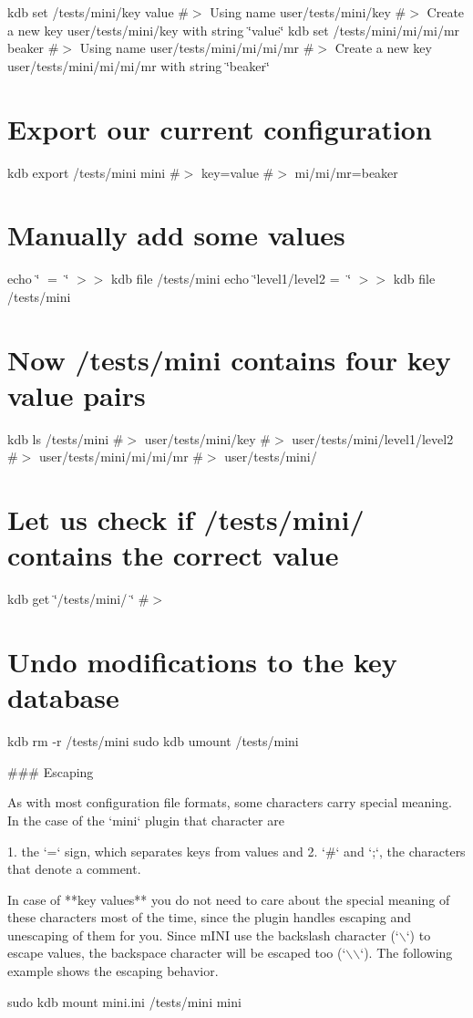 kdb set /tests/mini/key value \#$>$ Using name user/tests/mini/key \#$>$ Create a new key user/tests/mini/key with string \char`\"{}value\char`\"{} kdb set /tests/mini/mi/mi/mr beaker \#$>$ Using name user/tests/mini/mi/mi/mr \#$>$ Create a new key user/tests/mini/mi/mi/mr with string \char`\"{}beaker\char`\"{}

\section*{Export our current configuration}

kdb export /tests/mini mini \#$>$ key=value \#$>$ mi/mi/mr=beaker

\section*{Manually add some values}

echo \char`\"{}🔑 = 🦄\char`\"{} $>$$>$ {\ttfamily kdb file /tests/mini} echo \char`\"{}level1/level2 = 👾\char`\"{} $>$$>$ {\ttfamily kdb file /tests/mini}

\section*{Now {\ttfamily /tests/mini} contains four key value pairs}

kdb ls /tests/mini \#$>$ user/tests/mini/key \#$>$ user/tests/mini/level1/level2 \#$>$ user/tests/mini/mi/mi/mr \#$>$ user/tests/mini/🔑

\section*{Let us check if {\ttfamily /tests/mini/🔑} contains the correct value}

kdb get \char`\"{}/tests/mini/🔑\char`\"{} \#$>$ 🦄

\section*{Undo modifications to the key database}

kdb rm -\/r /tests/mini sudo kdb umount /tests/mini 
\begin{DoxyCode}
### Escaping

As with most configuration file formats, some characters carry special meaning. In the case of the `mini`
       plugin that character are

1. the `=` sign, which separates keys from values and
2. `#` and `;`, the characters that denote a comment.

In case of **key values** you do not need to care about the special meaning of these characters most of the
       time, since the plugin handles escaping and unescaping of them for you. Since mINI use the backslash
       character (`\(\backslash\)`) to escape values, the backspace character will be escaped too (`\(\backslash\)\(\backslash\)`). The following example shows
       the escaping behavior.
\end{DoxyCode}
 sudo kdb mount mini.\+ini /tests/mini mini

